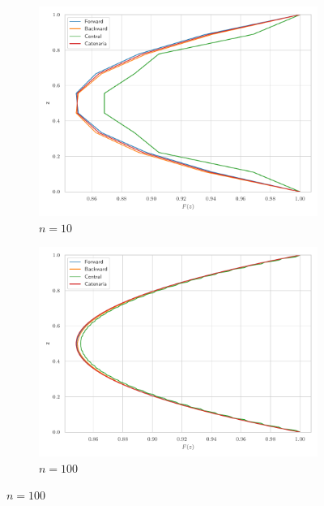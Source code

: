 \begin{figure}[h]
    \centering
    \begin{subfigure}[b]{0.45\textwidth}
        \centering
        \includegraphics[width=\textwidth]{Figures/01/sol_deriv_n10.pdf}
        \caption{$n = 10$}
        \label{fig:diff_n10}
    \end{subfigure}
    \hfill
    \begin{subfigure}[b]{0.45\textwidth}
        \centering
        \includegraphics[width=\textwidth]{Figures/01/sol_deriv_n100.pdf}
        \caption{$n = 100$}
        \label{fig:diff_n100}
    \end{subfigure}

    \vspace{1em} %


\end{figure}
